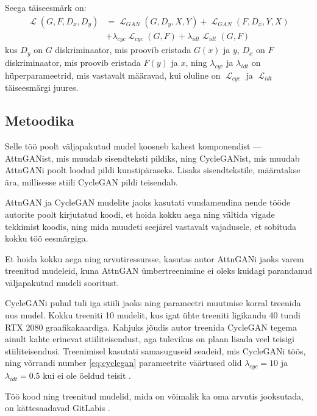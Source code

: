 \documentclass{vilgym}
\DeclareMathOperator{\loss}{\mathcal{L}}
\begin{document}
	Seega täiseesmärk on:
	\begin{equation} \label{eq:cyclegan}
		\begin{aligned}
			\loss(G, F, D_x, D_y) &= \loss_{GAN}(G, D_y, X, Y) + \loss_{GAN}(F, D_x, Y, X) \\
								  &+ \lambda_{cyc} \loss_{cyc}(G, F) + \lambda_{idt} \loss_{idt}(G, F)
		\end{aligned}
	\end{equation}
	kus $ D_y $ on $ G $ diskriminaator, mis proovib eristada $ G(x) $ ja $ y $, $ D_x $ on  $ F $ diskriminaator, mis proovib eristada $ F(y) $ ja $ x $, ning $ \lambda_{cyc} $ ja $ \lambda_{idt} $ on hüperparameetrid, mis vastavalt määravad, kui oluline on $ \loss_{cyc} $ ja $ \loss_{idt} $ täiseesmärgi juures. \parencite{cyclegan}

	\subsection{Metoodika}
	Selle töö poolt väljapakutud mudel koosneb kahest komponendist --- AttnGANist, mis muudab sisendteksti pildiks, ning CycleGANist, mis muudab AttnGANi poolt loodud pildi kunstipäraseks. Lisaks sisendtekstile, määratakse ära, millisesse stiili CycleGAN pildi teisendab.

	AttnGAN ja CycleGAN mudelite jaoks kasutati vundamendina nende tööde autorite poolt kirjutatud koodi, et hoida kokku aega ning vältida vigade tekkimist koodis, ning mida muudeti seejärel vastavalt vajadusele, et sobituda kokku töö eesmärgiga.

	Et hoida kokku aega ning arvutiressursse, kasutas autor AttnGANi jaoks varem treenitud mudeleid, kuna AttnGAN ümbertreenimine ei oleks kuidagi parandanud väljapakutud mudeli sooritust.

	CycleGANi puhul tuli iga stiili jaoks ning parameetri muutmise korral treenida uus mudel. Kokku treeniti 10 mudelit, kus igat ühte treeniti ligikaudu 40 tundi RTX 2080 graafikakaardiga. Kahjuks jõudis autor treenida CycleGAN tegema ainult kahte erinevat stiiliteisendust, aga tulevikus on plaan lisada veel teisigi stiiliteisendusi. Treenimisel kasutati samasuguseid seadeid, mis CycleGANi töös, ning võrrandi number \ref{eq:cyclegan} parameetrite väärtused olid $ \lambda_{cyc} = 10 $ ja $ \lambda_{idt} = 0.5 $ kui ei ole öeldud teisit \parencite{cyclegan}.

	Töö kood ning treenitud mudelid, mida on võimalik ka oma arvutis jooksutada, on kättesaadavad GitLabis \parencite{text2art-gan}.
\end{document}
